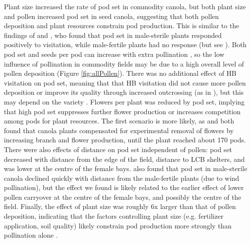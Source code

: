 \documentclass[12pt]{article} %
\begin{document}

Plant size increased the rate of pod set in commodity canola, but both plant size and pollen increased pod set in seed canola, suggesting that both pollen deposition and plant resources constrain pod production.
This is similar to the findings of \citet{mesquida1981} and \citet{steffan2003}, who found that pod set in male-sterile plants responded positively to visitation, while male-fertile plants had no response (but see \citealp{adegas1992}).
Both pod set and seeds per pod can increase with extra pollination \citep{jauker2008,sabbahi2005,sabbahi2006,duran2010}, so the low influence of pollination in commodity fields may be due to a high overall level of pollen deposition (Figure \ref{fig:allPollen}).
There was no additional effect of HB visitation on pod set, meaning that that HB visitation did not cause more pollen deposition or improve its quality through increased outcrossing (as in \citealt{rosa2011}), but this may depend on the variety \citep{adamidis2019}.
Flowers per plant was reduced by pod set, implying that high pod set suppresses further flower production or increases competition among pods for plant resources.
The first scenario is more likely, as \citet{sabbahi2006} and \citet{mesquida1981} both found that canola plants compensated for experimental removal of flowers by increasing branch and flower production, until the plant reached about 170 pods.
There were also effects of distance on pod set independent of pollen: pod set decreased with distance from the edge of the field, distance to LCB shelters, and was lower at the centre of the female bays.
\citet{mesquida1978} also found that pod set in male-sterile canola declined quickly with distance from the male-fertile plants (due to wind pollination), but the effect we found is likely related to the earlier effect of lower pollen carryover at the centre of the female bays, and possibly the centre of the field.
Finally, the effect of plant size was roughly 6x larger than that of pollen deposition, indicating that the factors controlling plant size (e.g. fertilizer application, soil quality) likely constrain pod production more strongly than pollination alone \citep{marini2015,tamburini2017, gagic2017, tamburini2019}. 

\end{document}
